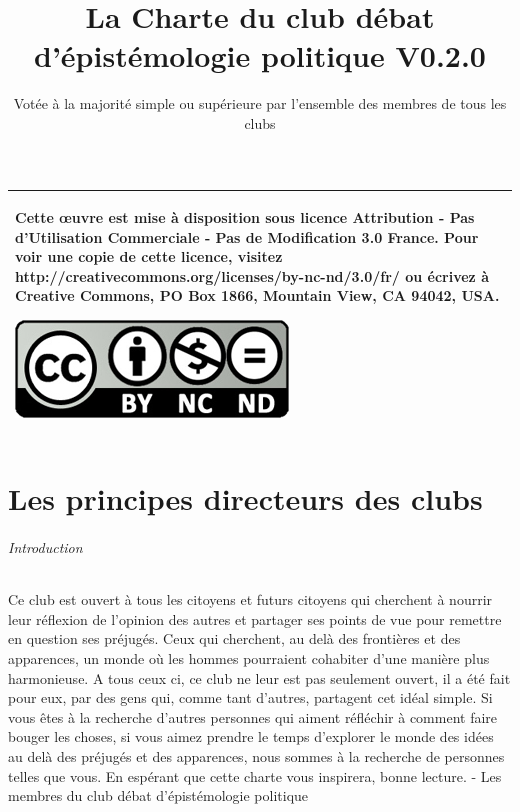\documentclass[a4paper,12pt]{article}
\title{\Huge{La Charte du club débat d'épistémologie politique} \LARGE{V0.2.0}}
\author{Votée à la majorité simple ou supérieure par l'ensemble des membres de tous les clubs}
\begin{document}
\maketitle

\begin{tabular}{|p{}|}
 \hline
 Cette œuvre est mise à disposition sous licence Attribution - Pas d’Utilisation Commerciale - Pas de Modification 3.0 France. Pour voir une copie de cette licence, visitez http://creativecommons.org/licenses/by-nc-nd/3.0/fr/ ou écrivez à Creative Commons, PO Box 1866, Mountain View, CA 94042, USA.
 \begin{center}
 \includegraphics[scale=1]{cc.jpg}
 \end{center}\\
 \hline
\end{tabular}
\newpage
\tableofcontents
\newpage

\part{Les principes directeurs des clubs}
\paragraph{Introduction}
Ce club est ouvert à tous les citoyens et futurs citoyens qui cherchent à nourrir leur réflexion de l'opinion des autres et partager ses points de vue pour remettre en question ses préjugés. Ceux qui cherchent, au delà des frontières et des apparences, un monde où les hommes pourraient cohabiter d'une manière plus harmonieuse. A tous ceux ci, ce club ne leur est pas seulement ouvert, il a été fait pour eux, par des gens qui, comme tant d'autres, partagent cet idéal simple. Si vous êtes à la recherche d'autres personnes qui aiment réfléchir à comment faire bouger les choses, si vous aimez prendre le temps d'explorer le monde des idées au delà des préjugés et des apparences, nous sommes à la recherche de personnes telles que vous. En espérant que cette charte vous inspirera, bonne lecture. - Les membres du club débat d'épistémologie politique
\end{document}
